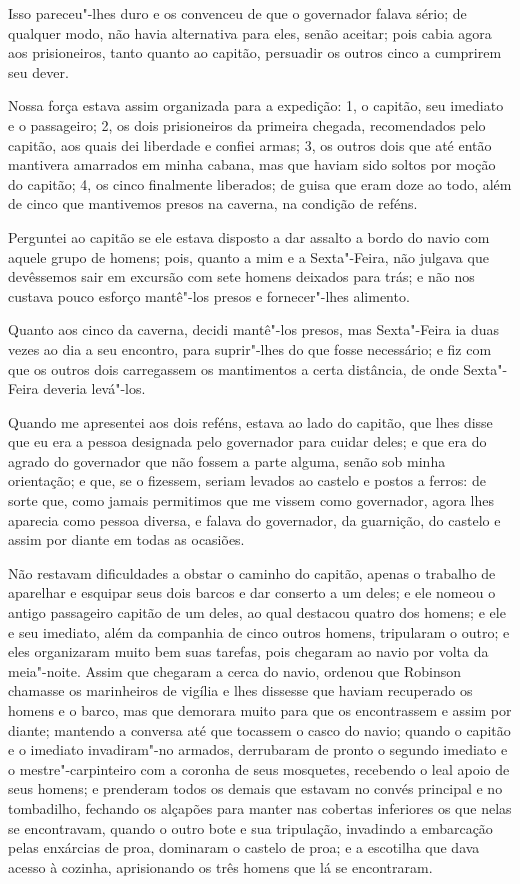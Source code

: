 Isso pareceu"-lhes duro e os convenceu de que o governador falava sério;
de qualquer modo, não havia alternativa para eles, senão aceitar; pois
cabia agora aos prisioneiros, tanto quanto ao capitão, persuadir os
outros cinco a cumprirem seu dever.

Nossa força estava assim organizada para a expedição: 1, o capitão, seu
imediato e o passageiro; 2, os dois prisioneiros da primeira chegada,
recomendados pelo capitão, aos quais dei liberdade e confiei armas; 3,
os outros dois que até então mantivera amarrados em minha cabana, mas
que haviam sido soltos por moção do capitão; 4, os cinco finalmente
liberados; de guisa que eram doze ao todo, além de cinco que mantivemos
presos na caverna, na condição de reféns.

Perguntei ao capitão se ele estava disposto a dar assalto a bordo do
navio com aquele grupo de homens; pois, quanto a mim e a Sexta"-Feira,
não julgava que devêssemos sair em excursão com sete homens deixados
para trás; e não nos custava pouco esforço mantê"-los presos e
fornecer"-lhes alimento.

Quanto aos cinco da caverna, decidi mantê"-los presos, mas Sexta"-Feira ia
duas vezes ao dia a seu encontro, para suprir"-lhes do que fosse
necessário; e fiz com que os outros dois carregassem os mantimentos a
certa distância, de onde Sexta"-Feira deveria levá"-los.

Quando me apresentei aos dois reféns, estava ao lado do capitão, que
lhes disse que eu era a pessoa designada pelo governador para cuidar
deles; e que era do agrado do governador que não fossem a parte alguma,
senão sob minha orientação; e que, se o fizessem, seriam levados ao
castelo e postos a ferros: de sorte que, como jamais permitimos que me
vissem como governador, agora lhes aparecia como pessoa diversa, e
falava do governador, da guarnição, do castelo e assim por diante em
todas as ocasiões.

Não restavam dificuldades a obstar o caminho do capitão, apenas o
trabalho de aparelhar e esquipar seus dois barcos e dar conserto a um
deles; e ele nomeou o antigo passageiro capitão de um deles, ao qual
destacou quatro dos homens; e ele e seu imediato, além da companhia de
cinco outros homens, tripularam o outro; e eles organizaram muito bem
suas tarefas, pois chegaram ao navio por volta da meia"-noite. Assim que
chegaram a cerca do navio, ordenou que Robinson chamasse os marinheiros
de vigília e lhes dissesse que haviam recuperado os homens e o barco,
mas que demorara muito para que os encontrassem e assim por diante;
mantendo a conversa até que tocassem o casco do navio; quando o capitão
e o imediato invadiram"-no armados, derrubaram de pronto o segundo
imediato e o mestre"-carpinteiro com a coronha de seus mosquetes,
recebendo o leal apoio de seus homens; e prenderam todos os demais que
estavam no convés principal e no tombadilho, fechando os alçapões para
manter nas cobertas inferiores os que nelas se encontravam, quando o
outro bote e sua tripulação, invadindo a embarcação pelas enxárcias de
proa, dominaram o castelo de proa; e a escotilha que dava acesso à
cozinha, aprisionando os três homens que lá se encontraram.

